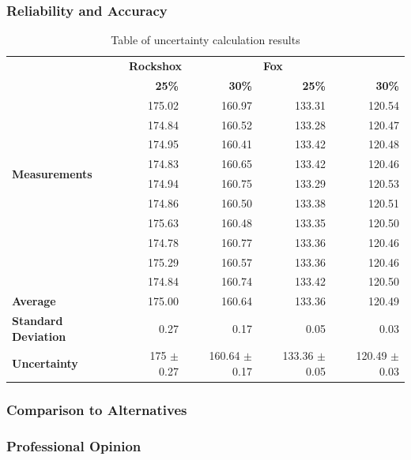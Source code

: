 	\subsubsection{Reliability and Accuracy}
		\begin{table}[h!]
			\centering
			\caption{Table of uncertainty calculation results}
			\label{tab:uncertainty}
			\begin{tabular}{|l|r|r|r|r|}
				\hline
				\multirow{12}{7em}{\bfseries Measurements}&\multicolumn{2}{|l|}{\bfseries Rockshox}&\multicolumn{2}{|l|}{\bfseries Fox}\\
				\cline{2-5}&\bfseries 25\%&\bfseries 30\%&\bfseries 25\%&\bfseries 30\%\\
				\hline
				&175.02&160.97&133.31&120.54\\
				&174.84&160.52&133.28&120.47\\
				&174.95&160.41&133.42&120.48\\
				&174.83&160.65&133.42&120.46\\
				&174.94&160.75&133.29&120.53\\
				&174.86&160.50&133.38&120.51\\
				&175.63&160.48&133.35&120.50\\
				&174.78&160.77&133.36&120.46\\
				&175.29&160.57&133.36&120.46\\
				&174.84&160.74&133.42&120.50\\
				\hline
				\bfseries Average&175.00&160.64&133.36&120.49\\
				\bfseries Standard Deviation&0.27&0.17&0.05&0.03\\
				\bfseries Uncertainty&175 $\pm$ 0.27&160.64 $\pm$ 0.17&133.36 $\pm$ 0.05&120.49 $\pm$ 0.03\\
				\hline
			\end{tabular}
		\end{table}
	\subsubsection{Comparison to Alternatives}
	\subsubsection{Professional Opinion}